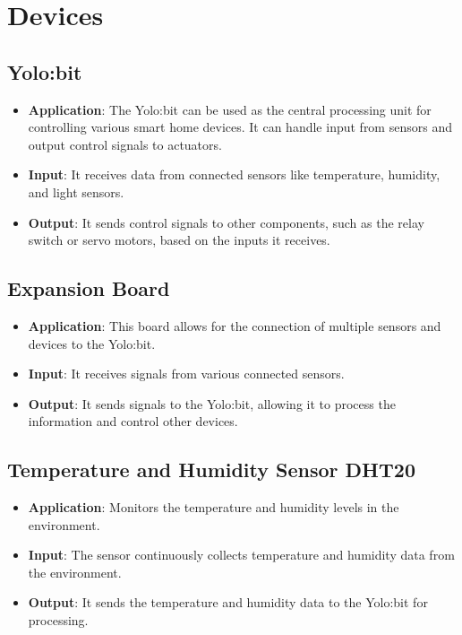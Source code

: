 \section{Devices}

\subsection{Yolo:bit}

\begin{itemize}
    \item \textbf{Application}: The Yolo:bit can be used as the central processing unit for controlling various smart home devices. It can handle input from sensors and output control signals to actuators.
    \item \textbf{Input}: It receives data from connected sensors like temperature, humidity, and light sensors.
    \item \textbf{Output}: It sends control signals to other components, such as the relay switch or servo motors, based on the inputs it receives.
\end{itemize}

\subsection{Expansion Board}

\begin{itemize}
    \item \textbf{Application}: This board allows for the connection of multiple sensors and devices to the Yolo:bit.
    \item \textbf{Input}: It receives signals from various connected sensors.
    \item \textbf{Output}: It sends signals to the Yolo:bit, allowing it to process the information and control other devices.
\end{itemize}

\subsection{Temperature and Humidity Sensor DHT20}

\begin{itemize}
    \item \textbf{Application}: Monitors the temperature and humidity levels in the environment.
    \item \textbf{Input}: The sensor continuously collects temperature and humidity data from the environment.
    \item \textbf{Output}: It sends the temperature and humidity data to the Yolo:bit for processing.
\end{itemize}

